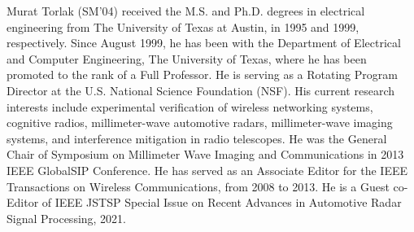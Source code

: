 \documentclass{ieeeaccess}
\begin{document}
\begin{IEEEbiography}{Murat Torlak} (SM’04) received the M.S. and Ph.D. degrees in electrical engineering from The University of Texas at Austin, in 1995 and 1999, respectively. Since August 1999, he has been with the Department of Electrical and Computer Engineering, The University of Texas, where he has been promoted to the rank of a Full Professor. He is serving as a Rotating Program Director at the U.S. National Science Foundation (NSF). His current research interests include experimental verification of wireless networking systems, cognitive radios, millimeter-wave automotive radars, millimeter-wave imaging systems, and interference mitigation in radio telescopes. He was the General Chair of Symposium on Millimeter Wave Imaging and Communications in 2013 IEEE GlobalSIP Conference. He has served as an Associate Editor for the IEEE Transactions on Wireless Communications, from 2008 to 2013. He is a Guest co-Editor of IEEE JSTSP Special Issue on Recent Advances in Automotive Radar Signal Processing, 2021.
\end{IEEEbiography}

\EOD
\end{document}
